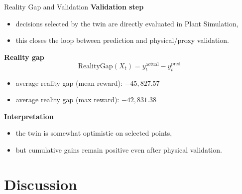 \documentclass[aspectratio=169,11pt]{beamer}
\begin{document}
\begin{frame}{Reality Gap and Validation}
    \textbf{Validation step}
    \begin{itemize}
        \item decisions selected by the twin are directly evaluated in Plant Simulation,
        \item this closes the loop between prediction and physical/proxy validation.
    \end{itemize}

    \vspace{0.4cm}
    \textbf{Reality gap}
    \[
    \text{RealityGap}(X_t)=y_t^{\text{actual}}-y_t^{\text{pred}}
    \]

    \begin{itemize}
        \item average reality gap (mean reward): \(-45{,}827.57\)
        \item average reality gap (max reward): \(-42{,}831.38\)
    \end{itemize}

    \textbf{Interpretation}
    \begin{itemize}
        \item the twin is somewhat optimistic on selected points,
        \item but cumulative gains remain positive even after physical validation.
    \end{itemize}
\end{frame}

\section{Discussion}
\end{document}
